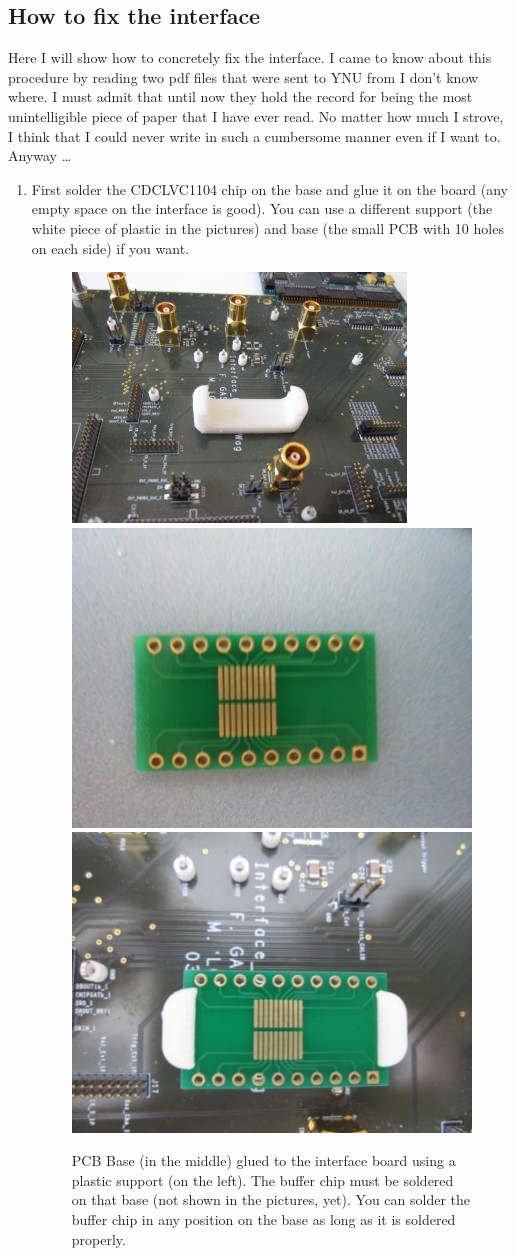 \subsection{How to fix the interface}
Here I will show how to concretely fix the interface. I came to know
about this procedure by reading two pdf files that were sent to YNU
from I don't know where. I must admit that until now they hold the
record for being the most unintelligible piece of paper that I have
ever read. No matter how much I strove, I think that I could never write in
such a cumbersome manner even if I want to. Anyway \dots
\begin{enumerate}
\item First solder the CDCLVC1104 chip on the base and glue it on the
  board (any empty space on the interface is good). You can use a
  different support (the white piece of plastic in the pictures) and
  base (the small PCB with 10 holes on each side) if you want.
  \begin{figure}[H]
    \centering \includegraphics[frame,width=.3\textwidth]{support}\hfill
    \includegraphics[frame,width=.3\textwidth]{base}\hfill
    \includegraphics[frame,width=.3\textwidth]{base-glued}
    \caption{PCB Base (in the middle) glued to the interface board
      using a plastic support (on the left). The buffer chip must be
      soldered on that base (not shown in the pictures, yet). You can
      solder the buffer chip in any position on the base as long as it
      is soldered properly.}\label{buffer}
  \end{figure}

\end{enumerate}

